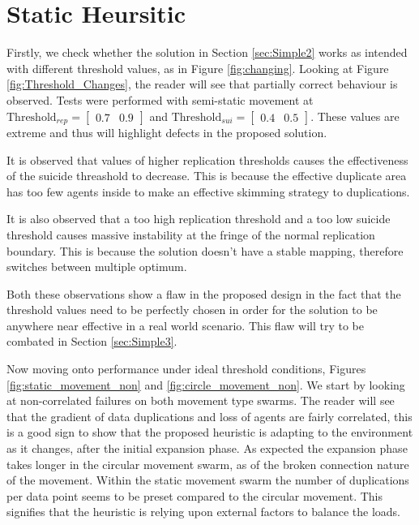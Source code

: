 \documentclass{UoYCSproject}
\begin{document}
\section{Static Heursitic}
\label{sec:Simple2a}

Firstly, we check whether the solution in Section \ref{sec:Simple2} works as intended with different threshold values, as in Figure \ref{fig:changing}. 
Looking at Figure \ref{fig:Threshold_Changes}, the reader will see that partially correct behaviour is observed. 
Tests were performed with semi-static movement at $\text{Threshold}_{rep} = \begin{bmatrix} 0.7 & 0.9 \end{bmatrix}$ and $\text{Threshold}_{sui} = \begin{bmatrix} 0.4 & 0.5 \end{bmatrix}$. 
These values are extreme and thus will highlight defects in the proposed solution.

It is observed that values of higher replication thresholds causes the effectiveness of the suicide threashold to decrease. 
This is because the effective duplicate area has too few agents inside to make an effective skimming strategy to duplications. 

It is also observed that a too high replication threshold and a too low suicide threshold causes massive instability at the fringe of the normal replication boundary. 
This is because the solution doesn’t have a stable mapping, therefore switches between multiple optimum.

Both these observations show a flaw in the proposed design in the fact that the threshold values need to be perfectly chosen in order for the solution to be anywhere near effective in a real world scenario. 
This flaw will try to be combated in Section \ref{sec:Simple3}.

Now moving onto performance under ideal threshold conditions, Figures \ref{fig:static_movement_non} and \ref{fig:circle_movement_non}. 
We start by looking at non-correlated failures on both movement type swarms. 
The reader will see that the gradient of data duplications and loss of agents are fairly correlated, this is a good sign to show that the proposed heuristic is adapting to the environment as it changes, after the initial expansion phase. 
As expected the expansion phase takes longer in the circular movement swarm, as of the broken connection nature of the movement. 
Within the static movement swarm the number of duplications per data point seems to be preset compared to the circular movement. 
This signifies that the heuristic is relying upon external factors to balance the loads.
\end{document}
